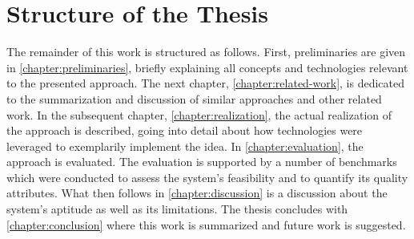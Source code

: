 \section{Structure of the Thesis}
The remainder of this work is structured as follows. First, preliminaries are given in \autoref{chapter:preliminaries}, briefly explaining all concepts and technologies relevant to the presented approach. The next chapter, \autoref{chapter:related-work}, is dedicated to the summarization and discussion of similar approaches and other related work. In the subsequent chapter, \autoref{chapter:realization}, the actual realization of the approach is described, going into detail about how technologies were leveraged to exemplarily implement the idea. In \autoref{chapter:evaluation}, the approach is evaluated. The evaluation is supported by a number of benchmarks which were conducted to assess the system's feasibility and to quantify its quality attributes. What then follows in \autoref{chapter:discussion} is a discussion about the system's aptitude as well as its limitations. The thesis concludes with \autoref{chapter:conclusion} where this work is summarized and future work is suggested.

%
%
%
%
%
%
%
%
%
%
%
%
%
%
%
%
%
%
%
%
%
%
%
%
%
%
%
%
%
%
%
%
%
%
%
%
%
%
